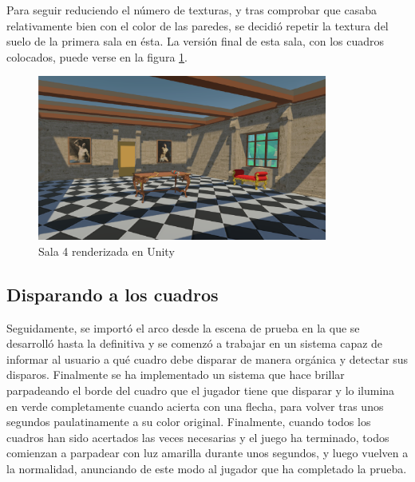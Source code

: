 Para seguir reduciendo el número de texturas, y tras comprobar que casaba relativamente bien con el color de las paredes, se decidió repetir la textura del suelo de la primera sala en ésta. La versión final de esta sala, con los cuadros colocados, puede verse en la figura \ref{fig:unity-sala-4}.

\begin{figure}[!h]
\begin{center}
\includegraphics[width=0.85\textwidth]{imagenes/7/salas-unity/unity-sala-4.png}
\caption{Sala 4 renderizada en Unity}
\label{fig:unity-sala-4}
\end{center}
\end{figure}

\subsection{Disparando a los cuadros}

Seguidamente, se importó el arco desde la escena de prueba en la que se desarrolló hasta la definitiva y se comenzó a trabajar en un sistema capaz de informar al usuario a qué cuadro debe disparar de manera orgánica y detectar sus disparos. Finalmente se ha implementado un sistema que hace brillar parpadeando el borde del cuadro que el jugador tiene que disparar y lo ilumina en verde completamente cuando acierta con una flecha, para volver tras unos segundos paulatinamente a su color original. Finalmente, cuando todos los cuadros han sido acertados las veces necesarias y el juego ha terminado, todos comienzan a parpadear con luz amarilla durante unos segundos, y luego vuelven a la normalidad, anunciando de este modo al jugador que ha completado la prueba.

